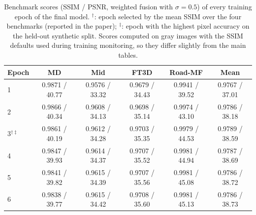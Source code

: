 \begin{table}[t]
\centering
\caption{Benchmark scores (SSIM / PSNR, weighted fusion with $\sigma=0.5$) of every training epoch of the final model. $^\dagger$: epoch selected by the mean SSIM over the four benchmarks (reported in the paper); $^\ddagger$: epoch with the highest pixel accuracy on the held-out synthetic split. Scores computed on gray images with the SSIM defaults used during training monitoring, so they differ slightly from the main tables.}
\label{tab:epochs}
\scriptsize
\begin{tabular}{lccccc}
\toprule
Epoch & MD & Mid & FT3D & Road-MF & Mean \\
\midrule
1 & 0.9871 / 40.77 & 0.9576 / 33.32 & 0.9679 / 34.43 & 0.9941 / 39.52 & 0.9767 / 37.01 \\
2 & 0.9866 / 40.34 & 0.9608 / 34.13 & 0.9698 / 35.14 & 0.9974 / 43.10 & 0.9786 / 38.18 \\
3$^{\dagger\ddagger}$ & 0.9861 / 40.19 & 0.9612 / 34.28 & 0.9703 / 35.35 & 0.9979 / 44.53 & 0.9789 / 38.59 \\
4 & 0.9847 / 39.93 & 0.9614 / 34.37 & 0.9707 / 35.52 & 0.9981 / 44.94 & 0.9787 / 38.69 \\
5 & 0.9841 / 39.82 & 0.9615 / 34.39 & 0.9707 / 35.56 & 0.9981 / 45.08 & 0.9786 / 38.72 \\
6 & 0.9838 / 39.77 & 0.9615 / 34.42 & 0.9708 / 35.60 & 0.9981 / 45.13 & 0.9786 / 38.73 \\
\bottomrule
\end{tabular}
\end{table}
